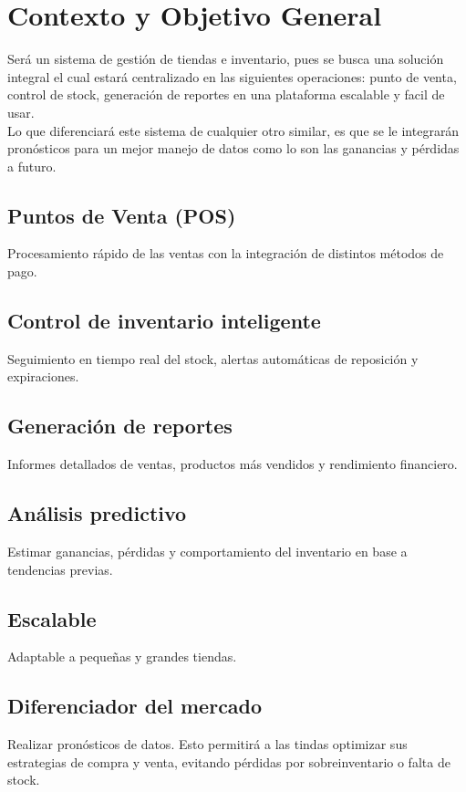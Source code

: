 \documentclass{article}
\begin{document}
\section{Contexto y Objetivo General}
    Ser\'a un sistema de gesti\'on de tiendas e inventario, pues se busca una soluci\'on integral el cual estar\'a centralizado en las siguientes operaciones: punto de venta, control de stock, generaci\'on de reportes en una plataforma escalable y facil de usar.\\
    Lo que diferenciar\'a este sistema de cualquier otro similar, es que se le integrar\'an pron\'osticos para un mejor manejo de datos como lo son las ganancias y p\'erdidas a futuro.

\subsection{Puntos de Venta (POS)}
    Procesamiento r\'apido de las ventas con la integraci\'on de distintos m\'etodos de pago.


\subsection{Control de inventario inteligente}
    Seguimiento en tiempo real del stock, alertas autom\'aticas de reposici\'on y expiraciones.

\subsection{Generaci\'on de reportes}
    Informes detallados de ventas, productos m\'as vendidos y rendimiento financiero.

\subsection{An\'alisis predictivo}
    Estimar ganancias, p\'erdidas y comportamiento del inventario en base a tendencias previas.

\subsection{Escalable}
    Adaptable a pequeñas y grandes tiendas.

\subsection{Diferenciador del mercado}
    Realizar pron\'osticos de datos. Esto permitir\'a a las tindas optimizar sus estrategias de compra y venta, evitando p\'erdidas por sobreinventario o falta de stock.
\end{document}
